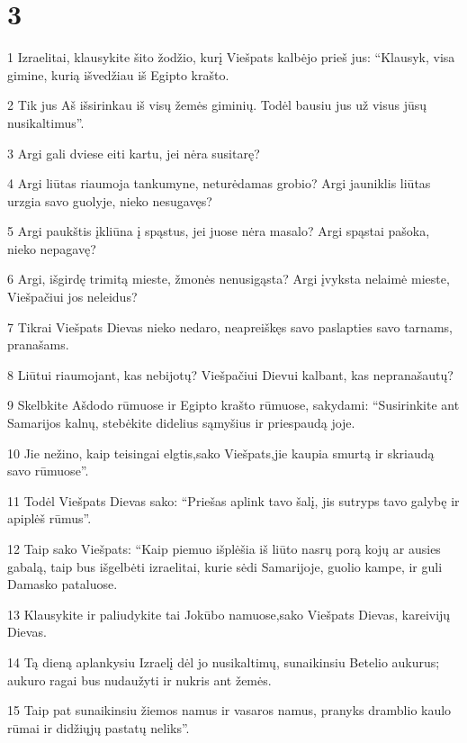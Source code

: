 \chapter{3}


\par 1 Izraelitai, klausykite šito žodžio, kurį Viešpats kalbėjo prieš jus: “Klausyk, visa gimine, kurią išvedžiau iš Egipto krašto. 
\par 2 Tik jus Aš išsirinkau iš visų žemės giminių. Todėl bausiu jus už visus jūsų nusikaltimus”. 
\par 3 Argi gali dviese eiti kartu, jei nėra susitarę? 
\par 4 Argi liūtas riaumoja tankumyne, neturėdamas grobio? Argi jauniklis liūtas urzgia savo guolyje, nieko nesugavęs? 
\par 5 Argi paukštis įkliūna į spąstus, jei juose nėra masalo? Argi spąstai pašoka, nieko nepagavę? 
\par 6 Argi, išgirdę trimitą mieste, žmonės nenusigąsta? Argi įvyksta nelaimė mieste, Viešpačiui jos neleidus? 
\par 7 Tikrai Viešpats Dievas nieko nedaro, neapreiškęs savo paslapties savo tarnams, pranašams. 
\par 8 Liūtui riaumojant, kas nebijotų? Viešpačiui Dievui kalbant, kas nepranašautų? 
\par 9 Skelbkite Ašdodo rūmuose ir Egipto krašto rūmuose, sakydami: “Susirinkite ant Samarijos kalnų, stebėkite didelius sąmyšius ir priespaudą joje. 
\par 10 Jie nežino, kaip teisingai elgtis,­sako Viešpats,­jie kaupia smurtą ir skriaudą savo rūmuose”. 
\par 11 Todėl Viešpats Dievas sako: “Priešas aplink tavo šalį, jis sutryps tavo galybę ir apiplėš rūmus”. 
\par 12 Taip sako Viešpats: “Kaip piemuo išplėšia iš liūto nasrų porą kojų ar ausies gabalą, taip bus išgelbėti izraelitai, kurie sėdi Samarijoje, guolio kampe, ir guli Damasko pataluose. 
\par 13 Klausykite ir paliudykite tai Jokūbo namuose,­sako Viešpats Dievas, kareivijų Dievas.­ 
\par 14 Tą dieną aplankysiu Izraelį dėl jo nusikaltimų, sunaikinsiu Betelio aukurus; aukuro ragai bus nudaužyti ir nukris ant žemės. 
\par 15 Taip pat sunaikinsiu žiemos namus ir vasaros namus, pranyks dramblio kaulo rūmai ir didžiųjų pastatų neliks”.



